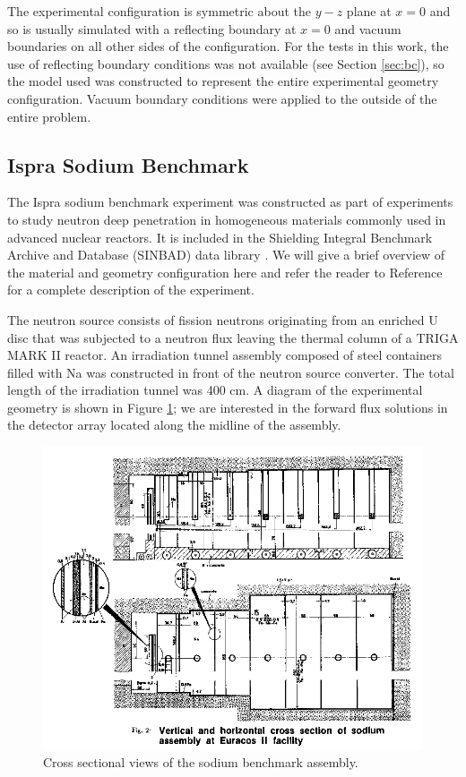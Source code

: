 The experimental configuration is symmetric about the $y-z$ plane at $x = 0$ and so is
usually simulated with a reflecting boundary at $x = 0$ and vacuum boundaries on all
other sides of the configuration. For the tests in this work, the use of reflecting
boundary conditions was not available (see Section \ref{sec:bc}), so the model used 
was constructed to represent the entire experimental geometry configuration. Vacuum
boundary conditions were applied to the outside of the entire problem.

\FloatBarrier
\subsection{Ispra Sodium Benchmark}

The Ispra sodium benchmark experiment was constructed as part of experiments to study
neutron deep penetration in homogeneous materials commonly used in advanced nuclear
reactors. It is included in the Shielding Integral Benchmark Archive and Database 
(SINBAD) data library \cite{sinbad}. We will give a brief overview of the material and
geometry configuration here and refer the reader to Reference \cite{sinbad} for a 
complete description of the experiment.

The neutron source consists of fission neutrons originating from an enriched U disc 
that was subjected to a neutron flux leaving the thermal column of a TRIGA MARK II 
reactor. An irradiation tunnel assembly composed of steel containers filled with Na 
was constructed in front of the neutron source converter. The total length of the 
irradiation tunnel was 400 cm. A diagram of the experimental geometry is shown in 
Figure \ref{eurac}; we are interested in the forward flux solutions in the detector
array located along the midline of the assembly.

\begin{figure}[!htb]
\centering
\includegraphics[width=\textwidth]{img/eurna-2v.png}
\caption{Cross sectional views of the sodium benchmark assembly.}
\label{eurac}
\end{figure}

